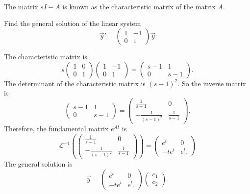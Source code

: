 The matrix $sI-A$ is known as the characteristic matrix of the matrix $A$.

\begin{example}
  Find the general solution of the linear system
  \[\vec{y}'=\begin{pmatrix}
    1 & -1\\
    0 & 1
  \end{pmatrix}\vec{y}
  \]
\end{example}
\begin{solution}
  The characteristic matrix is
  \[
    s\begin{pmatrix}
    1 & 0\\ 0 & 1
  \end{pmatrix} \begin{pmatrix}
    1 & -1\\
    0 & 1
  \end{pmatrix}=
  \begin{pmatrix}
    s-1 & 1 \\ 0 & s-1
  \end{pmatrix}.
  \]
  The determinant of the characteristic matrix is $(s-1)^2$. So the inverse matrix is
  \[
    \begin{pmatrix}
    s-1 & 1 \\ 0 & s-1
  \end{pmatrix}  = 
  \begin{pmatrix}
    \frac{1}{s-1} & 0 \\
    -\frac{1}{(s-1)^2} & \frac{1}{s-1}
  \end{pmatrix}.
  \]
 Therefore, the fundamental matrix $e^{At}$ is 
 \[
 \mathcal{L}^{-1}\left(\begin{pmatrix}
  \frac{1}{s-1} & 0 \\
  -\frac{1}{(s-1)^2} & \frac{1}{s-1}
\end{pmatrix}
\right)=
\begin{pmatrix}
  e^t & 0 \\
  -te^t & e^t.
\end{pmatrix}  
 \]
 The general solution is
 \[\vec{y}=\begin{pmatrix}
  e^t & 0 \\
  -te^t & e^t.
\end{pmatrix}\begin{pmatrix}
  c_1 \\ c_2
\end{pmatrix}.
\]
\end{solution}
